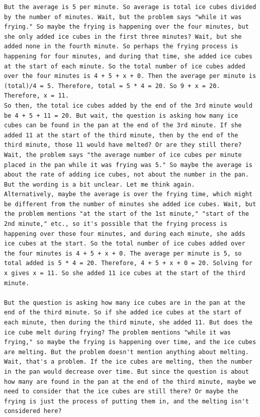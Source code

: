 \documentclass{article}
\theoremstyle{plain}
\theoremstyle{definition}
\theoremstyle{remark}
\begin{document}
\begin{lstlisting}
But the average is 5 per minute. So average is total ice cubes divided by the number of minutes. Wait, but the problem says "while it was frying." So maybe the frying is happening over the four minutes, but she only added ice cubes in the first three minutes? Wait, but she added none in the fourth minute. So perhaps the frying process is happening for four minutes, and during that time, she added ice cubes at the start of each minute. So the total number of ice cubes added over the four minutes is 4 + 5 + x + 0. Then the average per minute is (total)/4 = 5. Therefore, total = 5 * 4 = 20. So 9 + x = 20. Therefore, x = 11.
So then, the total ice cubes added by the end of the 3rd minute would be 4 + 5 + 11 = 20. But wait, the question is asking how many ice cubes can be found in the pan at the end of the 3rd minute. If she added 11 at the start of the third minute, then by the end of the third minute, those 11 would have melted? Or are they still there?
Wait, the problem says "the average number of ice cubes per minute placed in the pan while it was frying was 5." So maybe the average is about the rate of adding ice cubes, not about the number in the pan. But the wording is a bit unclear. Let me think again.
Alternatively, maybe the average is over the frying time, which might be different from the number of minutes she added ice cubes. Wait, but the problem mentions "at the start of the 1st minute," "start of the 2nd minute," etc., so it's possible that the frying process is happening over those four minutes, and during each minute, she adds ice cubes at the start. So the total number of ice cubes added over the four minutes is 4 + 5 + x + 0. The average per minute is 5, so total added is 5 * 4 = 20. Therefore, 4 + 5 + x + 0 = 20. Solving for x gives x = 11. So she added 11 ice cubes at the start of the third minute.

But the question is asking how many ice cubes are in the pan at the end of the third minute. So if she added ice cubes at the start of each minute, then during the third minute, she added 11. But does the ice cube melt during frying? The problem mentions "while it was frying," so maybe the frying is happening over time, and the ice cubes are melting. But the problem doesn't mention anything about melting. Wait, that's a problem. If the ice cubes are melting, then the number in the pan would decrease over time. But since the question is about how many are found in the pan at the end of the third minute, maybe we need to consider that the ice cubes are still there? Or maybe the frying is just the process of putting them in, and the melting isn't considered here?


\end{lstlisting}
\end{document}
